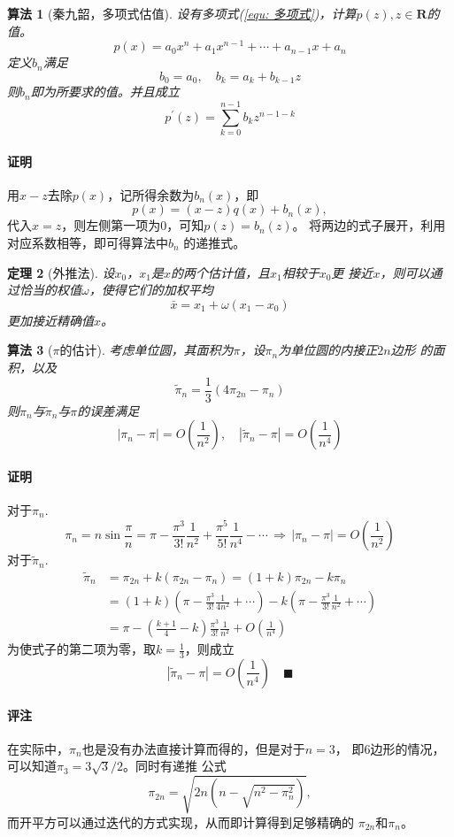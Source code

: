 \documentclass[12pt, a4paper]{article}
\theoremstyle{margin}
\newtheorem{thm}{定理}
\newtheorem{alg}[thm]{算法}
\newcommand{\R}{\mathbf{R}}
\newcommand\equref[1]{(\ref{#1})}
\newcommand{\remark}{\paragraph{评注}}
\newcommand{\proof}{\paragraph{证明}}
\begin{document}
  \begin{alg}[秦九韶，多项式估值]
    设有多项式\equref{equ: 多项式}，计算$p(z), z\in\R$的值。
    \begin{equation}
      \label{equ: 多项式}
      p(x) = a_0x^n + a_1x^{n-1} + \cdots + a_{n-1}x + a_n
    \end{equation}
    定义$b_n$满足
    \[
      b_0 = a_0, \quad b_k = a_k + b_{k-1}z
    \]
    则$b_n$即为所要求的值。并且成立
    \[
      p^{\prime}(z) = \sum_{k=0}^{n-1}b_kz^{n-1-k}
    \]
  \end{alg}
  \proof
    用$x-z$去除$p(x)$，记所得余数为$b_n(x)$，即
    \[
      p(x) = (x-z)q(x) + b_n(x),
    \]
    代入$x=z$，则左侧第一项为$0$，可知$p(z) = b_n(z)$。
    将两边的式子展开，利用对应系数相等，即可得算法中$b_n$
    的递推式。

  \begin{thm}[外推法]
    设$x_0$，$x_1$是$x$的两个估计值，且$x_1$相较于$x_0$更
    接近$x$，则可以通过恰当的权值$\omega$，使得它们的加权平均
    \[
      \bar{x} = x_1 + \omega(x_1-x_0)
    \]
    更加接近精确值$x$。
  \end{thm}

  \begin{alg}[$\pi$的估计]
    考虑单位圆，其面积为$\pi$，设$\pi_n$为单位圆的内接正$2n$边形
    的面积，以及
    \[
      \widetilde{\pi}_n = \frac{1}{3}(4\pi_{2n}-\pi_n)
    \]
    则$\pi_n$与$\widetilde{\pi}_n$与$\pi$的误差满足
    \[
      |\pi_n - \pi| = O(\frac{1}{n^2}), \quad
      |\widetilde{\pi}_n - \pi| = O(\frac{1}{n^4})
    \]
  \end{alg}
  \proof
    对于$\pi_n$.
    \[
      \pi_n=n\sin\frac{\pi}{n} =
      \pi - \frac{\pi^3}{3!}\frac{1}{n^2} +
      \frac{\pi^5}{5!}\frac{1}{n^4} - \cdots
      \,\Rightarrow \, |\pi_n - \pi| = O(\frac{1}{n^2})
    \]
    对于$\widetilde{\pi}_n$.
    \[\begin{split}
      \widetilde{\pi}_n & = \pi_{2n} + k(\pi_{2n} - \pi_n)
      = (1+k)\pi_{2n} - k\pi_n \\
      & = (1+k)(\pi - \frac{\pi^3}{3!}\frac{1}{4n^2} + \cdots)
      - k(\pi - \frac{\pi^3}{3!}\frac{1}{n^2} + \cdots) \\
      & = \pi - (\frac{k+1}{4} - k)\frac{\pi^3}{3!}\frac{1}{n^2}
      + O(\frac{1}{n^4})
    \end{split}\]
    为使式子的第二项为零，取$k=\frac{1}{3}$，则成立
    \[
      |\widetilde{\pi}_n - \pi| = O(\frac{1}{n^4})
      \quad\blacksquare
    \]
  \remark
    在实际中，$\pi_n$也是没有办法直接计算而得的，但是对于$n=3$，
    即$6$边形的情况，可以知道$\pi_3=3\sqrt{3}/2$。同时有递推
    公式
    \[
      \pi_{2n} = \sqrt{2n(n-\sqrt{n^2-\pi^2_n})},
    \]
    而开平方可以通过迭代的方式实现，从而即计算得到足够精确的
    $\pi_{2n}$和$\pi_n$。
\end{document}
